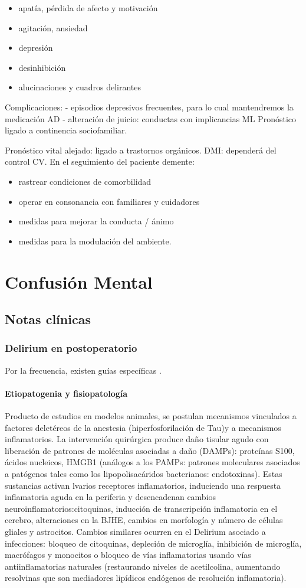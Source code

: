 \documentclass{scrbook}
\begin{document}
\begin{itemize}
	\item apatía, pérdida de afecto y motivación
	\item agitación, ansiedad
	\item depresión
	\item desinhibición
	\item alucinaciones y cuadros delirantes 
\end{itemize}

Complicaciones: 
- episodios depresivos frecuentes, para lo cual mantendremos la medicación AD 
- alteración de juicio: conductas con implicancias ML Pronóstico ligado a continencia sociofamiliar. 

Pronóstico vital alejado: ligado a trastornos orgánicos. DMI: dependerá del control CV. En el seguimiento del paciente demente:
 
\begin{itemize}
	\item rastrear condiciones de comorbilidad 
	\item operar en consonancia con familiares y cuidadores 
	\item medidas para mejorar la conducta / ánimo 
	\item medidas para la modulación del ambiente.
\end{itemize}
\printbibliography
\chapter{Confusión Mental}
\section*{Notas clínicas}
\subsection*{Delirium en postoperatorio}
Por la frecuencia, existen guías específicas \cite{aldecoa2023update}.
\subsubsection*{Etiopatogenia y fisiopatología}
Producto de estudios en modelos animales, se postulan mecanismos vinculados a factores deletéreos de la anestesia (hiperfosforilación de Tau)y a mecanismos inflamatorios. La intervención quirúrgica produce daño tisular agudo con liberación de patrones de moléculas asociadas a daño (DAMPs): proteínas S100, ácidos nucleicos, HMGB1 (análogos a los PAMPs: patrones moleculares asociados a patógenos tales como los lipopolisacáridos bacterianos: endotoxinas). Estas sustancias activan lvarios receptores inflamatorios, induciendo una respuesta inflamatoria aguda en la periferia y desencadenan cambios neuroinflamatorios:citoquinas, inducción de transcripción inflamatoria en el cerebro, alteraciones en la BJHE, cambios en morfología y número de células gliales y astrocitos. 
Cambios similares ocurren en el Delirium asociado a infecciones: bloqueo de citoquinas, depleción de microglía, inhibición de microglía, macrófagos y monocitos o bloqueo de vías inflamatorias usando vías antiinflamatorias naturales (restaurando niveles de acetilcolina, aumentando resolvinas que son mediadores lipídicos endógenos de resolución inflamatoria). 
\end{document}
